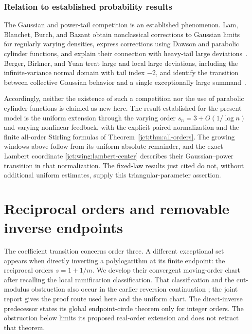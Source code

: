 \subsubsection{Relation to established probability results}

The Gaussian and power-tail competition is an established phenomenon.
Lam, Blanchet, Burch, and Bazant obtain nonclassical corrections to
Gaussian limits for regularly varying densities, express corrections
using Dawson and parabolic cylinder functions, and explain their
connection with heavy-tail large deviations~\cite{jct:lam}.
Berger, Birkner, and Yuan treat large and local large deviations,
including the infinite-variance normal domain with tail index $-2$,
and identify the transition between collective Gaussian behavior and
a single exceptionally large summand~\cite{jct:berger}.

Accordingly, neither the existence of such a competition nor the use
of parabolic cylinder functions is claimed as new here.  The result
established for the present model is the uniform extension through the
varying order $s_n=3+O(1/\log n)$ and varying nonlinear feedback,
with the explicit paired normalization and the finite all-order
Stirling formulas of Theorem~\ref{jct:thm:all-orders}.  The growing windows
above follow from its uniform absolute remainder, and the exact
Lambert coordinate \eqref{jct:wing:lambert-center} describes their
Gaussian--power transition in that normalization.  The fixed-law
results just cited do not, without additional uniform estimates,
supply this triangular-parameter assertion.

\section{Reciprocal orders and removable inverse endpoints}
\label{jct:sec:endpoints}

The coefficient transition concerns order three. A different exceptional
set appears when directly inverting a polylogarithm at its finite
endpoint: the reciprocal orders $s=1+1/m$. We develop their convergent
moving-order chart after recalling the local ramification classification.
That classification and the cut-modulus obstruction also occur in the
earlier reversion continuation \cite{llc:reversion}; the joint report
\cite{jct:report} gives the proof route used here and the uniform chart.
The direct-inverse predecessor \cite{jct:inverse} states its global
endpoint-circle theorem only for integer orders. The obstruction below
limits its proposed real-order extension and does not retract that theorem.

